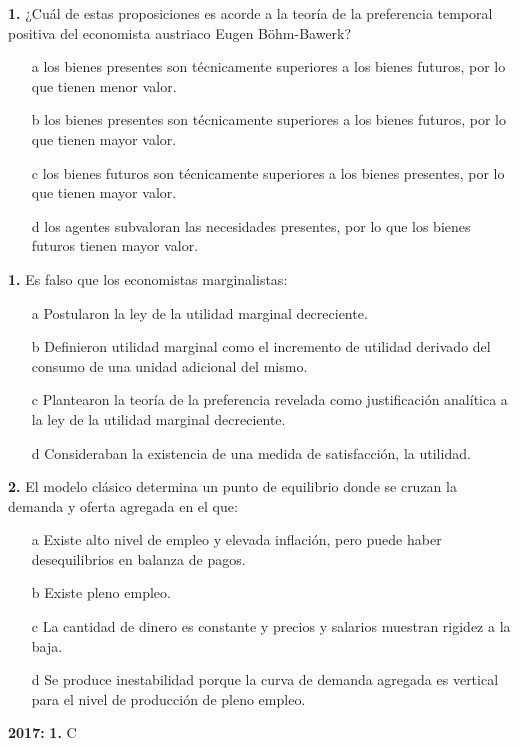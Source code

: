 \documentclass{nuevotema}
\begin{document}
\textbf{1.} ¿Cuál de estas proposiciones es acorde a la teoría de la preferencia temporal positiva del economista austriaco Eugen Böhm-Bawerk?
\begin{itemize}
	\item[a] los bienes presentes son técnicamente superiores a los bienes futuros, por lo que tienen menor valor.
	\item[b] los bienes presentes son técnicamente superiores a los bienes futuros, por lo que tienen mayor valor.
	\item[c] los bienes futuros son técnicamente superiores a los bienes presentes, por lo que tienen mayor valor.
	\item[d] los agentes subvaloran las necesidades presentes, por lo que los bienes futuros tienen mayor valor.
\end{itemize}

\textbf{1.} Es falso que los economistas marginalistas:
\begin{itemize}
	\item[a] Postularon la ley de la utilidad marginal decreciente.
	\item[b] Definieron utilidad marginal como el incremento de utilidad derivado del consumo de una unidad adicional del mismo.
	\item[c] Plantearon la teoría de la preferencia revelada como justificación analítica a la ley de la utilidad marginal decreciente.
	\item[d] Consideraban la existencia de una medida de satisfacción, la utilidad.
\end{itemize}

\textbf{2.} El modelo clásico determina un punto de equilibrio donde se cruzan la demanda y oferta agregada en el que:
\begin{itemize}
	\item[a] Existe alto nivel de empleo y elevada inflación, pero puede haber desequilibrios en balanza de pagos.
	\item[b] Existe pleno empleo.
	\item[c] La cantidad de dinero es constante y precios y salarios muestran rigidez a la baja.
	\item[d] Se produce inestabilidad porque la curva de demanda agregada es vertical para el nivel de producción de pleno empleo.
\end{itemize}

\notas

\textbf{2017:} \textbf{1.} C
\end{document}
